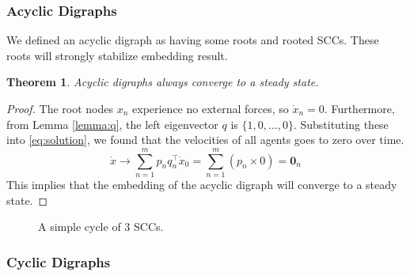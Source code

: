 \documentclass[letterpaper, 10 pt, conference]{ieeeconf}  %
\newtheorem{theorem}{Theorem}[section]
\begin{document}
\subsubsection{Acyclic Digraphs}

We defined an acyclic digraph as having some roots and rooted SCCs. These roots will strongly stabilize embedding result. 

\begin{theorem}
    Acyclic digraphs always converge to a steady state.
\end{theorem}

\begin{proof}
The root nodes \( x_n \) experience no external forces, so \( \dot{x}_n = 0 \). Furthermore, from Lemma \ref{lemma:q}, the left eigenvector \( q \) is \( \{1, 0, \dots, 0\} \). Substituting these into \eqref{eq:solution}, we found that the velocities of all agents goes to zero over time. 
\begin{equation}\label{eq:0_n}
    \dot{x} \rightarrow \sum_{n=1}^m p_n q_n^\top \dot{x}_0 = \sum_{n=1}^m (p_n \times 0) = \mathbf{0}_n
\end{equation}
This implies that the embedding of the acyclic digraph will converge to a steady state.
\end{proof}



\begin{figure}[h]
\centering
{}
\caption{A simple cycle of 3 SCCs.}
\label{fig:DCG}
\end{figure}



\subsubsection{Cyclic Digraphs}
\end{document}
